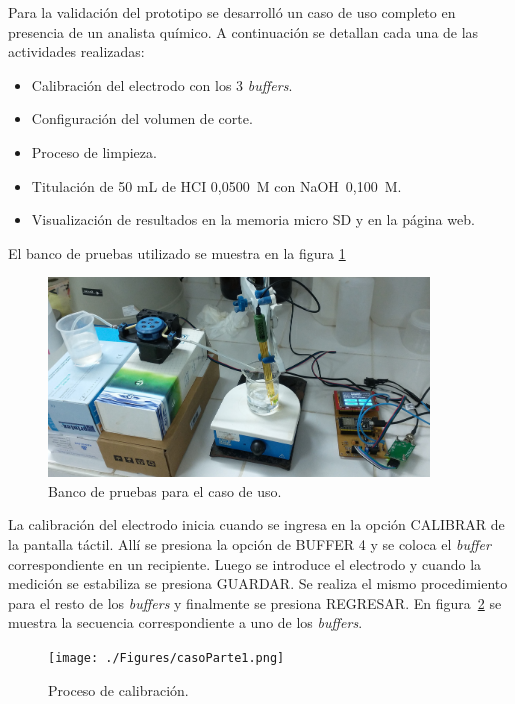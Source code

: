 Para la validación del prototipo se desarrolló un caso de uso completo en presencia de un analista químico. A continuación se detallan cada una de las actividades realizadas:
\begin{itemize}
	\item Calibración del electrodo con los 3 \textit{buffers}.
	\item Configuración del volumen de corte.
	\item Proceso de limpieza.
	\item Titulación de 50 mL de HCI 0,0500~M con NaOH~0,100~M.
	\item Visualización de resultados en la memoria micro SD y en la página web.
\end{itemize}

El banco de pruebas utilizado se muestra en la figura \ref{fig:bancoPruebasCompleto}

\begin{figure}[htbp]
	\centering
	\includegraphics[width=0.9\textwidth]{./Figures/casoTitulacion.jpg}
	\caption{Banco de pruebas para el caso de uso.}
	\label{fig:bancoPruebasCompleto}
\end{figure}

La calibración del electrodo inicia cuando se ingresa en la opción CALIBRAR de la pantalla táctil. Allí se presiona la opción de BUFFER 4 y se coloca el \textit{buffer} correspondiente en un recipiente. Luego se introduce el electrodo y cuando la medición se estabiliza se presiona GUARDAR. Se realiza el mismo procedimiento para el resto de los \textit{buffers} y finalmente se presiona REGRESAR. En figura~\ref{fig:casoParte1} se muestra la secuencia correspondiente a uno de los \textit{buffers}.

\begin{figure}[htbp]
	\centering
	\texttt{[image: ./Figures/casoParte1.png]}
	\caption{Proceso de calibración.}
	\label{fig:casoParte1}
\end{figure}

